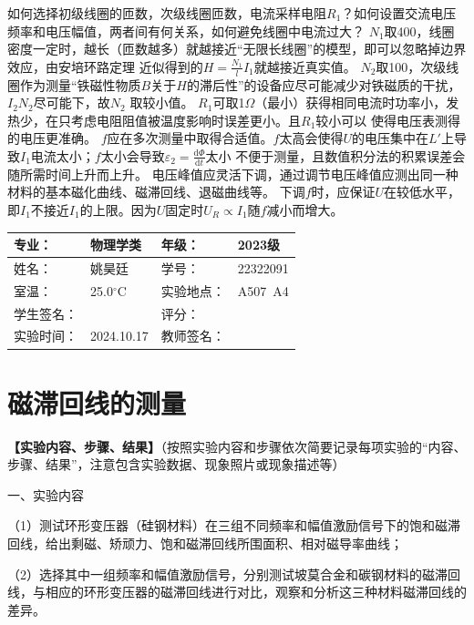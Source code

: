 \documentclass[dvipsnames, svgnames,a4paper,11pt]{article}
\renewcommand{\d}{\mathrm{d}}
\begin{document}
\begin{question}
	如何选择初级线圈的匝数，次级线圈匝数，电流采样电阻$R_1$？如何设置交流电压频率和电压幅值，两者间有何关系，如何避免线圈中电流过大？
	\tcblower
	$N_1$取400，线圈密度一定时，越长（匝数越多）就越接近“无限长线圈”的模型，即可以忽略掉边界效应，由安培环路定理
	近似得到的$H=\frac{N_1}{l}I_1$就越接近真实值。
	$N_2$取100，次级线圈作为测量“铁磁性物质$B$关于$H$的滞后性”的设备应尽可能减少对铁磁质的干扰，$I_2N_2$尽可能下，故$N_2$
	取较小值。
	$R_1$可取1$\Omega$（最小）获得相同电流时功率小，发热少，在只考虑电阻阻值被温度影响时误差更小。且$R_1$较小可以
	使得电压表测得的电压更准确。
	$f$应在多次测量中取得合适值。$f$太高会使得$U$的电压集中在$L'$上导致$I_1$电流太小；$f$太小会导致$\varepsilon_2=\frac{\d \Phi}{\d t}$太小
	不便于测量，且数值积分法的积累误差会随所需时间上升而上升。
	电压峰值应灵活下调，通过调节电压峰值应测出同一种材料的基本磁化曲线、磁滞回线、退磁曲线等。
	下调$f$时，应保证$U$在较低水平，即$I_1$不接近$I_1$的上限。因为$U$固定时$U_R\propto I_1$随$f$减小而增大。
\end{question}



\clearpage
{}
\begin{table}
	\renewcommand\arraystretch{1.7}
	\centering
	\begin{tabularx}{\textwidth}{|X|X|X|X|}
	\hline
	专业：& 物理学类 &年级：& 2023级 \\
	\hline
	姓名：& 姚昊廷 &学号：&22322091  \\
	\hline
	室温：&25.0$^\circ$C&实验地点：&A507\ A4\\
	\hline
	学生签名：& & 评分： &\\
	\hline
	实验时间：& 2024.10.17& 教师签名：&\\
	\hline
	\end{tabularx}
\end{table}

\section{磁滞回线的测量}
\textbf{【实验内容、步骤、结果】}（按照实验内容和步骤依次简要记录每项实验的“内容、步骤、结果”，注意包含实验数据、现象照片或现象描述等）

一、实验内容

（1）测试环形变压器（硅钢材料）在三组不同频率和幅值激励信号下的饱和磁滞回线，给出剩磁、矫顽力、饱和磁滞回线所围面积、相对磁导率曲线；

（2）选择其中一组频率和幅值激励信号，分别测试坡莫合金和碳钢材料的磁滞回线，与相应的环形变压器的磁滞回线进行对比，观察和分析这三种材料磁滞回线的差异。
\end{document}
